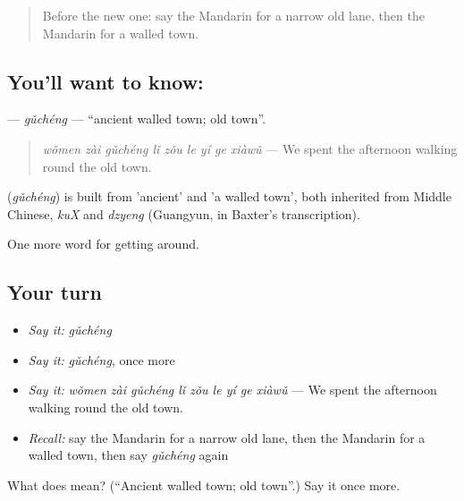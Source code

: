 \label{lesson:ZH-C446-gucheng}



\begin{quote}
Before the new one: say the Mandarin for a narrow old lane, then the Mandarin for a walled town.
\end{quote}

\subsection*{You'll want to know: }
\textbf{} — \emph{gǔchéng} — \textquotedblleft{}ancient walled town; old town\textquotedblright{}.

\begin{quote}
\textbf{} \emph{wǒmen zài gǔchéng lǐ zǒu le yí ge xiàwǔ} — We spent the afternoon walking round the old town.
\end{quote}

\begin{cousinweb}
\textbf{} (\emph{gǔchéng}) is built from  'ancient' and  'a walled town', both inherited from Middle Chinese, \emph{kuX} and \emph{dzyeng} (Guangyun, in Baxter's transcription).
\end{cousinweb}

\begin{grammarlens}[title={What you've built}]
One more word for getting around.
\end{grammarlens}

\subsection*{Your turn}
\begin{itemize}
\raggedright
  \item \emph{Say it:} \emph{gǔchéng}
  \item \emph{Say it:} \emph{gǔchéng}, once more
  \item \emph{Say it:} \emph{wǒmen zài gǔchéng lǐ zǒu le yí ge xiàwǔ} — We spent the afternoon walking round the old town.
  \item \emph{Recall:} say the Mandarin for a narrow old lane, then the Mandarin for a walled town, then say \emph{gǔchéng} again
\end{itemize}

\begin{tcolorbox}[breakable,colback=teal!4,colframe=teal!35!black,title={Before you move on}]
What does  mean? (\textquotedblleft{}Ancient walled town; old town\textquotedblright{}.) Say it once more.
\end{tcolorbox}
